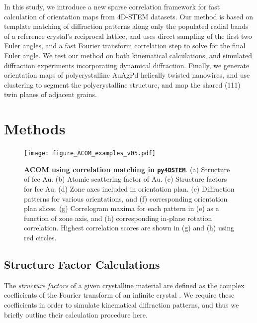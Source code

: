 \documentclass[%
 superscriptaddress,
 aip,
 amsmath,amssymb,
reprint,%
 author-year,%
longbibliography
]{revtex4-2}
\newcommand{\pyFDSTEM}{\href{https://github.com/py4dstem/py4DSTEM}{\texttt{py4DSTEM}}}
\begin{document}
In this study, we introduce a new sparse correlation framework for fast calculation of orientation maps from 4D-STEM datasets. Our method is based on template matching of diffraction patterns along only the populated radial bands of a reference crystal's reciprocal lattice, and uses direct sampling of the first two Euler angles, and a fast Fourier transform correlation step to solve for the final Euler angle. We test our method on both kinematical calculations, and simulated diffraction experiments incorporating dynamical diffraction. Finally, we generate orientation maps of polycrystalline AuAgPd helically twisted nanowires, and use clustering to segment the polycrystalline structure, and map the shared (111) twin planes of adjacent grains.%




\section*{Methods}

\begin{figure}[htbp]
    \centering
    \texttt{[image: figure\_ACOM\_examples\_v05.pdf]}
    \caption{{\bf ACOM using correlation matching in \pyFDSTEM{}}. (a) Structure of fcc Au. (b) Atomic scattering factor of Au. (c) Structure factors for fcc Au. (d) Zone axes included in orientation plan. (e) Diffraction patterns for various orientations, and (f) corresponding orientation plan slices. (g) Correlogram maxima for each pattern in (e) as a function of zone axis, and (h) corresponding in-plane rotation correlation. Highest correlation scores are shown in (g) and (h) using red circles.}
    \label{Fig:ACOM_corr_match}
\end{figure}



\subsection*{Structure Factor Calculations}

The \emph{structure factors} of a given crystalline material are defined as the complex coefficients of the Fourier transform of an infinite crystal \citep{spence1993accurate}. We require these coefficients in order to simulate kinematical diffraction patterns, and thus we briefly outline their calculation procedure here.
\end{document}
